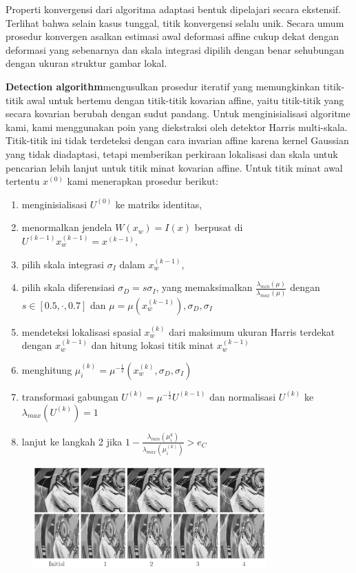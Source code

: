 Properti konvergensi dari algoritma adaptasi bentuk dipelajari secara ekstensif. Terlihat bahwa selain kasus tunggal, titik konvergensi selalu unik. Secara umum prosedur konvergen asalkan estimasi awal deformasi affine cukup dekat dengan deformasi yang sebenarnya dan skala integrasi dipilih dengan benar sehubungan dengan ukuran struktur gambar lokal.

\textbf{Detection algorithm}mengusulkan prosedur iteratif yang memungkinkan titik-titik awal untuk bertemu dengan titik-titik kovarian affine, yaitu titik-titik yang secara kovarian berubah dengan sudut pandang. Untuk menginisialisasi algoritme kami, kami menggunakan poin yang diekstraksi oleh detektor Harris multi-skala. Titik-titik ini tidak terdeteksi dengan cara invarian affine karena kernel Gaussian yang tidak diadaptasi, tetapi memberikan perkiraan lokalisasi dan skala untuk pencarian lebih lanjut untuk titik minat kovarian affine. 
Untuk titik minat awal tertentu \(x^{(0)}\) kami menerapkan prosedur berikut:

\begin{enumerate}
  \item menginisialisasi \(U^(0)\) ke matriks identitas,
  \item menormalkan jendela \(W(x_{w})=I(x)\) berpusat di \(U^{(k-1)}x_{w}^{(k-1)} = x^{(k-1)}\),
  \item pilih skala integrasi \(\sigma_{I}\) dalam \(x^{(k-1)}_{w}\),
  \item pilih skala diferensiasi \(\sigma_{D}=s\sigma_{I}\), yang memaksimalkan \(\frac{\lambda_{min}(\mu)}{\lambda_{max}(\mu)}\) dengan \(s \in [0.5,\cdot,0.7]\) dan \(\mu = \mu(x_{w}^{(k-1)}),\sigma_{D},\sigma_{I}\)
  \item mendeteksi lokalisasi spasial \(x^{(k)}_{w}\) dari maksimum ukuran Harris terdekat dengan \(x^{(k-1)}_{w}\) dan hitung lokasi titik minat \(x^{(k-1)}_{w}\)
  \item menghitung \(\mu^{(k)}_{i}=\mu^{-\frac{1}{2}}(x^{(k)}_{w},\sigma_{D},\sigma_{I})\)
  \item transformasi gabungan \(U^{(k)}=\mu^{-\frac{1}{2}}U^{(k-1)}\) dan normalisasi \(U^{(k)}\) ke \(\lambda_{max}(U^{(k)})=1\)
  \item lanjut ke langkah 2 jika \(1 - \frac{\lambda_{min}(\mu^{k}_{i})}{\lambda_{max}(\mu^{(k)}_{i})} > e_{C}\)
\end{enumerate}

\begin{figure}
  \centering{}
  \includegraphics[width=0.8\textwidth]{gambar/Iterative evolution.jpg}
  \caption{}
\end{figure}

